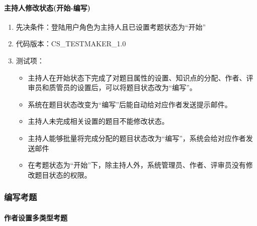 \documentclass[hyperref, a4paper]{ctexart}
\providecommand{\tightlist}{%
  \setlength{\itemsep}{0pt}\setlength{\parskip}{0pt}}
\let\oldparagraph\paragraph
\renewcommand{\paragraph}[1]{\oldparagraph{#1}\mbox{}}
\begin{document}
\hypertarget{ux4e3bux6301ux4ebaux4feeux6539ux72b6ux6001ux5f00ux59cb-ux7f16ux5199}{%
\paragraph{主持人修改状态(开始-编写)}\label{ux4e3bux6301ux4ebaux4feeux6539ux72b6ux6001ux5f00ux59cb-ux7f16ux5199}}

\begin{enumerate}
\def\labelenumi{\arabic{enumi}.}
\tightlist
\item
  先决条件：登陆用户角色为主持人且已设置考题状态为``开始''
\item
  代码版本：CS\_TESTMAKER\_1.0
\item
  测试项：

  \begin{itemize}
  \tightlist
  \item
    主持人在开始状态下完成了对题目属性的设置、知识点的分配、作者、评审员和质管员的设置后，可以将题目状态改为``编写''。
  \item
    系统在题目状态改变为``编写''后能自动给对应作者发送提示邮件。
  \item
    主持人未完成相关设置的题目不能修改状态。
  \item
    主持人能够批量将完成分配的题目状态改为``编写''，系统会给对应作者发送邮件
  \item
    在考题状态为``开始''下，除主持人外，系统管理员、作者、评审员没有修改题目状态的权限。
  \end{itemize}
\end{enumerate}

\hypertarget{ux7f16ux5199ux8003ux9898}{%
\subsubsection{编写考题}\label{ux7f16ux5199ux8003ux9898}}

\hypertarget{ux4f5cux8005ux8bbeux7f6eux591aux7c7bux578bux8003ux9898}{%
\paragraph{作者设置多类型考题}\label{ux4f5cux8005ux8bbeux7f6eux591aux7c7bux578bux8003ux9898}}
\end{document}
